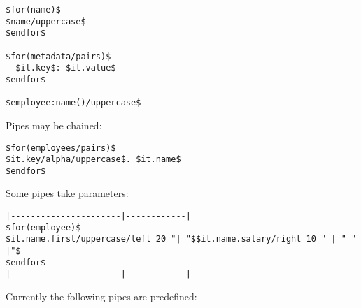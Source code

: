 \documentclass[
]{article}
\begin{document}
\begin{verbatim}
$for(name)$
$name/uppercase$
$endfor$

$for(metadata/pairs)$
- $it.key$: $it.value$
$endfor$

$employee:name()/uppercase$
\end{verbatim}

Pipes may be chained:

\begin{verbatim}
$for(employees/pairs)$
$it.key/alpha/uppercase$. $it.name$
$endfor$
\end{verbatim}

Some pipes take parameters:

\begin{verbatim}
|----------------------|------------|
$for(employee)$
$it.name.first/uppercase/left 20 "| "$$it.name.salary/right 10 " | " " |"$
$endfor$
|----------------------|------------|
\end{verbatim}

Currently the following pipes are predefined:
\end{document}
